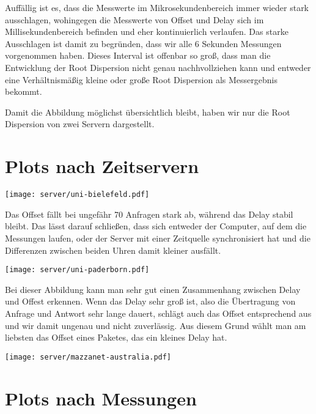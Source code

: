 \documentclass[a4paper, 11pt, fleqn, notitlepage, egregdoesnotlikesansseriftitles]{scrartcl}
\begin{document}
Auffällig ist es, dass die Messwerte im Mikrosekundenbereich immer wieder stark ausschlagen, wohingegen die Messwerte von Offset und Delay sich im Millisekundenbereich befinden und eher kontinuierlich verlaufen. Das starke Ausschlagen ist damit zu begründen, dass wir alle 6 Sekunden Messungen vorgenommen haben. Dieses Interval ist offenbar so groß, dass man die Entwicklung der Root Dispersion nicht genau nachhvollziehen kann und entweder eine Verhältnismäßig kleine oder große Root Dispersion als Messergebnis bekommt.

Damit die Abbildung möglichst übersichtlich bleibt, haben wir nur die Root Dispersion von zwei Servern dargestellt.

\section*{Plots nach Zeitservern}

\begin{center}
    \texttt{[image: server/uni-bielefeld.pdf]}
    \label{fig:bielefeld}
\end{center}

Das Offset fällt bei ungefähr 70 Anfragen stark ab, während das Delay stabil bleibt. Das lässt darauf schließen, dass sich entweder der Computer, auf dem die Messungen laufen, oder der Server mit einer Zeitquelle synchronisiert hat und die Differenzen zwischen beiden Uhren damit kleiner ausfällt.

\begin{center}
    \texttt{[image: server/uni-paderborn.pdf]}
    \label{fig:paderborn}
\end{center}

Bei dieser Abbildung kann man sehr gut einen Zusammenhang zwischen Delay und Offest erkennen. Wenn das Delay sehr groß ist, also die Übertragung von Anfrage und Antwort sehr lange dauert, schlägt auch das Offset entsprechend aus und wir damit ungenau und nicht zuverlässig. Aus diesem Grund wählt man am liebsten das Offset eines Paketes, das ein kleines Delay hat.

\begin{center}
    \texttt{[image: server/mazzanet-australia.pdf]}
    \label{fig:mazzanet}
\end{center}

\section*{Plots nach Messungen}
\end{document}
